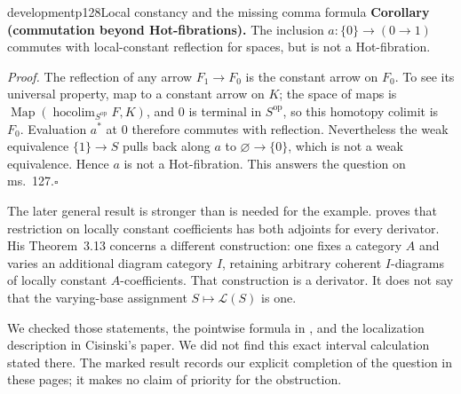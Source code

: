\begin{dcomment}{development}{p128}{Local constancy and the missing comma formula}
\textbf{Corollary (commutation beyond Hot-fibrations).}\ours
The inclusion $a:\{0\}\to(0\to1)$ commutes with local-constant reflection for spaces, but is not a Hot-fibration.

\textit{Proof.} The reflection of any arrow $F_1\to F_0$ is the constant arrow on $F_0$. To see its universal property, map to a constant arrow on $K$; the space of maps is $\operatorname{Map}(\operatorname{hocolim}_{S^{\mathrm{op}}}F,K)$, and $0$ is terminal in $S^{\mathrm{op}}$, so this homotopy colimit is $F_0$. Evaluation $a^*$ at $0$ therefore commutes with reflection. Nevertheless the weak equivalence $\{1\}\to S$ pulls back along $a$ to $\varnothing\to\{0\}$, which is not a weak equivalence. Hence $a$ is not a Hot-fibration. This answers the question on ms.~127.\hfill$\square$

The later general result is stronger than is needed for the example. \citet[Corollary~3.11]{Cisinski2009LocallyConstant} proves that restriction on locally constant coefficients has both adjoints for every derivator. His Theorem~3.13 concerns a different construction: one fixes a category $A$ and varies an additional diagram category $I$, retaining arbitrary coherent $I$-diagrams of locally constant $A$-coefficients. That construction is a derivator. It does not say that the varying-base assignment $S\mapsto\mathcal L(S)$ is one.

We checked those statements, the pointwise formula in \citet[Proposition~1.26]{Groth2013}, and the localization description in Cisinski's paper. We did not find this exact interval calculation stated there. The marked result records our explicit completion of the question in these pages; it makes no claim of priority for the obstruction.
\end{dcomment}

